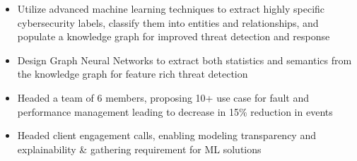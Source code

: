 \documentclass[10pt,a4paper,ragged2e,withhyper]{altacv}
\author{Madhusudan Kumar}
\date{\today}
\title{}
\begin{document}

\makecvheader

\begin{paracol}{2}
\label{sec:orgb71bfc8}
\begin{itemize}

\item Utilize advanced machine learning techniques to extract highly specific cybersecurity labels, classify them into entities and relationships, and populate a knowledge graph for improved threat detection and response
\item Design Graph Neural Networks to extract both statistics and semantics from the knowledge graph for feature rich threat detection
\end{itemize}



\par\divider

\begin{itemize}
\item Headed a team of 6 members, proposing 10+ use case for fault and performance management leading to decrease in 15\% reduction in events 
\item Headed client engagement calls, enabling modeling transparency and explainability \& gathering requirement for ML solutions
\end{itemize}


\end{paracol}
\end{document}
